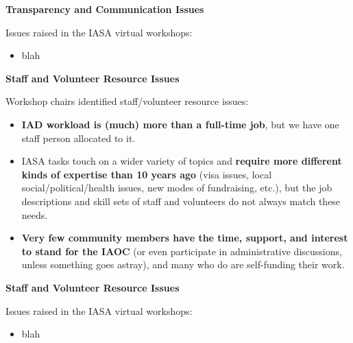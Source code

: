 \documentclass[helvetica]{seminar}
\newcommand{\heading}[1]{%
  \begin{center} 
    \large\bf 
    #1 
  \end{center} 
  \vspace{.4 in}}
\begin{document}
\begin{slide}
\heading{Transparency and Communication Issues}

Issues raised in the IASA virtual workshops:
\begin{itemize}
\item blah
\end{itemize}

\end{slide}


\begin{slide}
\heading{Staff and Volunteer Resource Issues}

Workshop chairs identified staff/volunteer resource issues:
{\footnotesize
\begin{itemize}
\item \textbf{IAD workload is (much) more than a full-time job}, but
  we have one staff person allocated to it.
\item IASA tasks touch on a wider variety of topics and
  \textbf{require more different kinds of expertise than 10 years ago}
  (visa issues, local social/political/health issues, new modes of
  fundraising, etc.), but the job descriptions and skill sets of staff
  and volunteers do not always match these needs.
\item \textbf{Very few community members have the time, support, and
  interest to stand for the IAOC} (or even participate in
  administrative discussions, unless something goes astray), and many
  who do are self-funding their work.
\end{itemize}
}

\end{slide}

\begin{slide}
\heading{Staff and Volunteer Resource Issues}

Issues raised in the IASA virtual workshops:
\begin{itemize}
\item blah
\end{itemize}

\end{slide}
\end{document}
